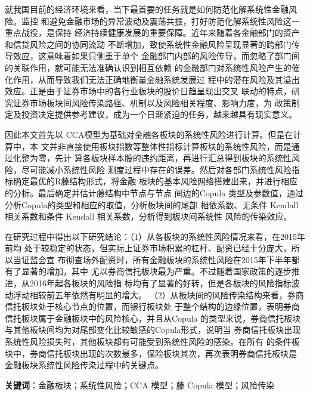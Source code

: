 \begin{cabstract}
  \renewcommand{\chapterlabel}{摘\hspace{2em}要}

  就我国目前的经济环境来看，当下最首要的任务就是如何防范化解系统性金融风险。监控
  和避免金融市场的异常波动及震荡共振，打好防范化解系统性风险这一重点战役，是保持
  经济持续健康发展的重要保障。近年来随着各金融部门的资产和信贷风险之间的协同流动
  不断增加，致使系统性金融风险呈现显著的跨部门传导效应，这意味着如果只侧重于单个
  金融部门内部的风险传导，而忽略了部门间的关联作用，就可能无法准确认识到相互依赖
  的金融部门对系统性风险产生的催化作用，从而导致我们无法正确地衡量金融系统发展过
  程中的潜在风险及其溢出效应。正是由于证券市场中的各行业板块的股价日趋呈现出交叉
  联动的特点，研究证券市场板块间风险传染路径、机制以及风险相关程度、影响力度，为
  政策制定及投资决定提供参考建议，成为一个日渐紧迫的任务，越来越具有现实意义。

  因此本文首先以 CCA模型为基础对金融各板块的系统性风险进行计算。但是在计算中，本
  文并非直接使用板块指数等整体性指标计算板块的系统性风险，而是通过化整为零，先计
  算各板块样本股的违约距离，再进行汇总得到板块的系统性风险，尽可能减小系统性风险
  测度过程中存在的误差。然后对各部门系统性风险指标确定最优的R藤结构形式，将金融
  板块的基本风险网络搭建出来，并进行相应的分析。最后确定并估计藤结构中节点与节点
  间边的Copula 类型及参数值，通过分析Copula的类型和相应的取值，分析板块间的尾部
  相依系数、无条件 Kendall相关系数和条件 Kendall 相关系数，分析得到板块间系统性
  风险的传染效应。
  
  在研究过程中得出以下研究结论：（1）从各板块的系统性风险情况来看，在2015年前均
  处于较稳定的状态，但实际上证券市场积累的杠杆、配资已经十分庞大，所以当证监会宣
  布彻查场外配资时，所有金融板块的系统性风险在2015年下半年都有了显著的增加，其中
  尤以券商信托板块最为严重。不过随着国家政策的逐步推进，从2016年起各板块的风险指
  标均有了显著的好转，但是各板块的风险指标波动浮动相较前五年依然有明显的增大。
  （2）从板块间的风险传染结构来看，券商信托板块处于核心节点的位置，而银行板块处
  于整个结构的边缘位置，表明券商信托板块属于金融板块中的风险核心，并且从Copula
  的类型来说，券商信托板块与其他板块间均为对尾部变化比较敏感的Copula形式，说明当
  券商信托板块出现系统性风险损失时，其他板块都有可能受到系统性风险的感染。在所有
  的条件板块中，券商信托板块出现的次数最多，保险板块其次，再次表明券商信托板块是
  金融板块系统性风险传染过程中的关键点。
 
  
  \bigbreak

  {\bfseries 关键词}：金融板块；系统性风险；CCA 模型；藤 Copula 模型；风险传染
   
\blankpage
\end{cabstract}




